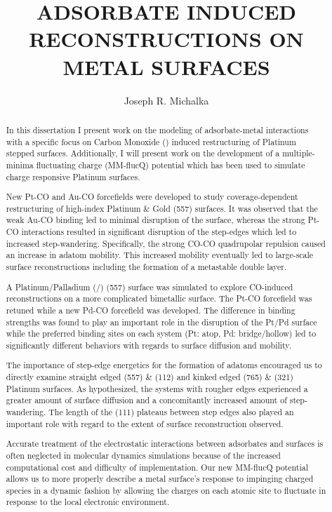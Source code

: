 \begin{abstract}
\title{ADSORBATE INDUCED RECONSTRUCTIONS ON METAL SURFACES}
\author{Joseph R. Michalka}
In this dissertation I present work on the modeling of adsorbate-metal
interactions with a specific focus on Carbon Monoxide () induced
restructuring of Platinum stepped surfaces. Additionally, I will present work
on the development of a multiple-minima fluctuating charge (MM-flucQ) potential
which has been used to simulate charge responsive Platinum surfaces.

New Pt-CO and Au-CO forcefields were developed to study coverage-dependent
restructuring of high-index Platinum \& Gold (557) surfaces. It was observed
that the weak Au-CO binding led to minimal disruption of the surface, whereas
the strong Pt-CO interactions resulted in significant disruption of the
step-edges which led to increased step-wandering. Specifically, the strong
CO-CO quadrupolar repulsion caused an increase in adatom mobility. This
increased mobility eventually led to large-scale surface reconstructions
including the formation of a metastable double layer.

A Platinum/Palladium (/) (557) surface was simulated to explore
CO-induced reconstructions on a more complicated bimetallic surface. The Pt-CO
forcefield was retuned while a new Pd-CO forcefield was developed.  The
difference in binding strengths was found to play an important role in the
disruption of the Pt/Pd surface while the preferred binding sites on each
system (Pt: atop, Pd: bridge/hollow) led to significantly different behaviors
with regards to surface diffusion and mobility.

The importance of step-edge energetics for the formation of adatoms encouraged
us to directly examine straight edged (557) \& (112) and kinked edged (765) \&
(321) Platinum surfaces.  As hypothesized, the systems with rougher edges
experienced a greater amount of surface diffusion and a concomitantly increased
amount of step-wandering. The length of the (111) plateaus between step edges
also played an important role with regard to the extent of surface
reconstruction observed.

Accurate treatment of the electrostatic interactions between adsorbates and
surfaces is often neglected in molecular dynamics simulations because of the
increased computational cost and difficulty of implementation.  Our new
MM-flucQ potential allows us to more properly describe a metal surface's
response to impinging charged species in a dynamic fashion by allowing the
charges on each atomic site to fluctuate in response to the local electronic
environment.
\end{abstract}

